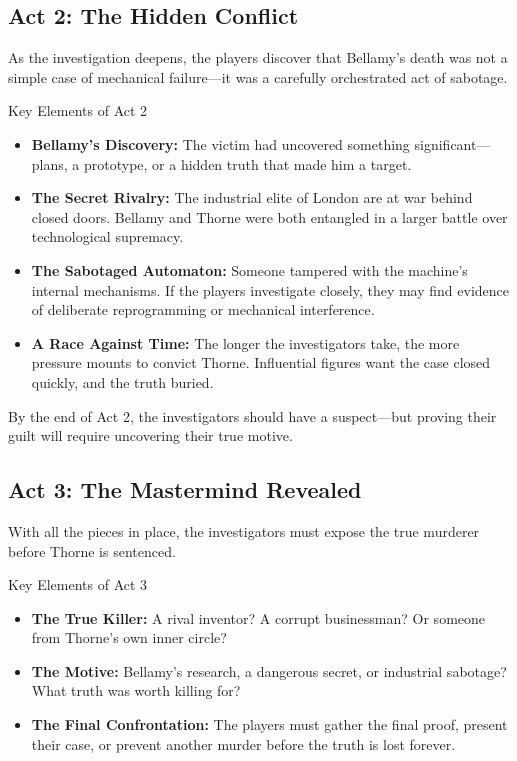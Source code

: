 \subsection{Act 2: The Hidden Conflict}  
As the investigation deepens, the players discover that Bellamy’s death was not a simple case of mechanical failure—it was a carefully orchestrated act of sabotage.

\begin{Example}{Key Elements of Act 2}
    \begin{itemize}
        \item \textbf{Bellamy’s Discovery:} The victim had uncovered something significant—plans, a prototype, or a hidden truth that made him a target.
        \item \textbf{The Secret Rivalry:} The industrial elite of London are at war behind closed doors. Bellamy and Thorne were both entangled in a larger battle over technological supremacy.
        \item \textbf{The Sabotaged Automaton:} Someone tampered with the machine’s internal mechanisms. If the players investigate closely, they may find evidence of deliberate reprogramming or mechanical interference.
        \item \textbf{A Race Against Time:} The longer the investigators take, the more pressure mounts to convict Thorne. Influential figures want the case closed quickly, and the truth buried.
    \end{itemize}
\end{Example}

\noindent
By the end of Act 2, the investigators should have a suspect—but proving their guilt will require uncovering their true motive.

\subsection{Act 3: The Mastermind Revealed}  
With all the pieces in place, the investigators must expose the true murderer before Thorne is sentenced.

\begin{Example}{Key Elements of Act 3}
    \begin{itemize}
        \item \textbf{The True Killer:} A rival inventor? A corrupt businessman? Or someone from Thorne’s own inner circle?
        \item \textbf{The Motive:} Bellamy’s research, a dangerous secret, or industrial sabotage? What truth was worth killing for?
        \item \textbf{The Final Confrontation:} The players must gather the final proof, present their case, or prevent another murder before the truth is lost forever.
    \end{itemize}
\end{Example}


